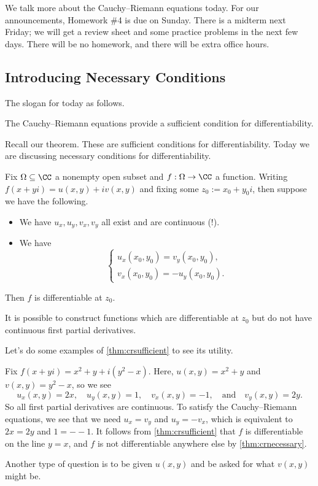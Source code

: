 
We talk more about the Cauchy--Riemann equations today. For our announcements, Homework \#4 is due on Sunday. There is a midterm next Friday; we will get a review sheet and some practice problems in the next few days. There will be no homework, and there will be extra office hours.

\subsection{Introducing Necessary Conditions}

The slogan for today as follows.
\begin{idea}
	The Cauchy--Riemann equations provide a sufficient condition for differentiability.
\end{idea}
Recall our theorem.
\cauchyriemannnecessary*
\noindent These are sufficient conditions for differentiability. Today we are discussing necessary conditions for differentiability.
\begin{theorem} \label{thm:crsufficient}
	Fix $\Omega\subseteq\CC$ a nonempty open subset and $f:\Omega\to\CC$ a function. Writing $f(x+yi)=u(x,y)+iv(x,y)$ and fixing some $z_0:=x_0+y_0i$, then suppose we have the following.
	\begin{itemize}
		\item We have $u_x,u_y,v_x,v_y$ all exist and are continuous (!).
		\item We have
		\[\begin{cases}
			u_x(x_0,y_0)=v_y(x_0,y_0), \\
			v_x(x_0,y_0)=-u_y(x_0,y_0).
		\end{cases}\]
	\end{itemize}
	Then $f$ is differentiable at $z_0$.
\end{theorem}
\begin{remark}
	It is possible to construct functions which are differentiable at $z_0$ but do not have continuous first partial derivatives.
\end{remark}
Let's do some examples of \autoref{thm:crsufficient} to see its utility.
\begin{example}
	Fix $f(x+yi)=x^2+y+i\left(y^2-x\right)$. Here, $u(x,y)=x^2+y$ and $v(x,y)=y^2-x$, so we see
	\[u_x(x,y)=2x,\quad u_y(x,y)=1,\quad v_x(x,y)=-1,\quad\text{and}\quad v_y(x,y)=2y.\]
	So all first partial derivatives are continuous. To satisfy the Cauchy--Riemann equations, we see that we need $u_x=v_y$ and $u_y=-v_x$, which is equivalent to $2x=2y$ and $1=--1$. It follows from \autoref{thm:crsufficient} that $f$ is differentiable on the line $y=x$, and $f$ is not differentiable anywhere else by \autoref{thm:crnecessary}.
\end{example}
\begin{remark}
	Another type of question is to be given $u(x,y)$ and be asked for what $v(x,y)$ might be.
\end{remark}

